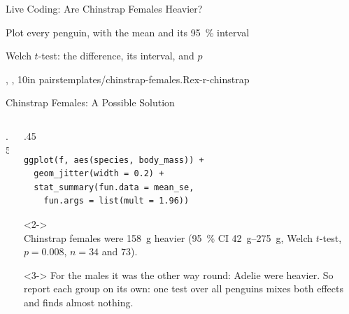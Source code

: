 \begin{frame}{Live Coding: Are Chinstrap Females Heavier?}
   {\item Plot every penguin, with the mean and its \qty{95}{\percent} interval
    \item Welch \(t\)-test: the difference, its interval, and \(p\)}
   {, , }
   {10}{in pairs}{templates/chinstrap-females.R}{ex-r-chinstrap}
\end{frame}

\begin{frame}{Chinstrap Females: A Possible Solution}
\begin{columns}[t,onlytextwidth]
   \begin{column}{.5\textwidth}
\scriptsize
{}
   \end{column}
   \begin{column}{.45\textwidth}
\scriptsize
\begin{verbatim}
ggplot(f, aes(species, body_mass)) +
  geom_jitter(width = 0.2) +
  stat_summary(fun.data = mean_se,
    fun.args = list(mult = 1.96))
\end{verbatim}
\small
\begin{uncoverenv}<2->
\\
Chinstrap females were \qty{158}{\gram} heavier (\qty{95}{\percent} CI \qtyrange{42}{275}{\gram}, Welch \(t\)-test, \(p = 0.008\), \(n = 34\) and \(73\)).
\end{uncoverenv}
\par\medskip
\begin{uncoverenv}<3->
\footnotesize\color{darkgray}
For the males it was the other way round: Adelie were heavier. So report each group on its own: one test over all penguins mixes both effects and finds almost nothing.
\end{uncoverenv}
\end{column}
\end{columns}
\end{frame}

